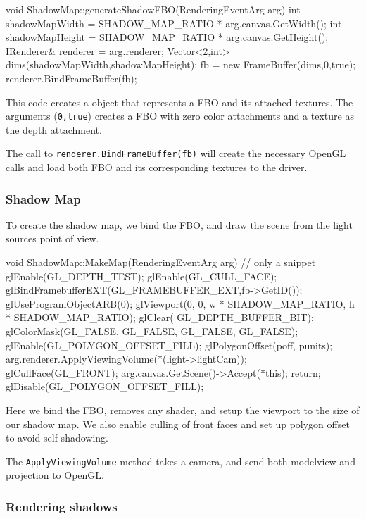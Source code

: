 \begin{cppcode}
void ShadowMap::generateShadowFBO(RenderingEventArg arg) {
	int shadowMapWidth = SHADOW_MAP_RATIO * arg.canvas.GetWidth();
	int shadowMapHeight = SHADOW_MAP_RATIO * arg.canvas.GetHeight();
    IRenderer& renderer = arg.renderer;
    Vector<2,int> dims(shadowMapWidth,shadowMapHeight);
    fb = new FrameBuffer(dims,0,true);
    renderer.BindFrameBuffer(fb);
}
\end{cppcode}

This code creates a object that represents a FBO and its attached
textures. The arguments (\texttt{0,true}) creates a FBO with zero color
attachments and a texture as the depth attachment.

The call to \texttt{renderer.BindFrameBuffer(fb)} will create the
necessary OpenGL calls and load both FBO and its corresponding
textures to the driver.

\subsubsection*{Shadow Map}

To create the shadow map, we bind the FBO, and draw the scene from the
light sources point of view. 

\begin{cppcode}
void ShadowMap::MakeMap(RenderingEventArg arg) {
     // only a snippet
    glEnable(GL_DEPTH_TEST);
    glEnable(GL_CULL_FACE);
    glBindFramebufferEXT(GL_FRAMEBUFFER_EXT,fb->GetID());
    glUseProgramObjectARB(0);
    glViewport(0, 0,
               w * SHADOW_MAP_RATIO,
               h * SHADOW_MAP_RATIO);
    glClear( GL_DEPTH_BUFFER_BIT);
    glColorMask(GL_FALSE, GL_FALSE, GL_FALSE, GL_FALSE); 
    glEnable(GL_POLYGON_OFFSET_FILL);
    glPolygonOffset(poff, punits);
    arg.renderer.ApplyViewingVolume(*(light->lightCam));
    glCullFace(GL_FRONT);
    arg.canvas.GetScene()->Accept(*this); return;
    glDisable(GL_POLYGON_OFFSET_FILL);
}
\end{cppcode}

Here we bind the FBO, removes any shader, and setup the viewport to
the size of our shadow map. We also enable culling of front faces and
set up polygon offset to avoid self shadowing.

The \texttt{ApplyViewingVolume} method takes a camera, and send both
modelview and projection to OpenGL.


\subsubsection*{Rendering shadows}


